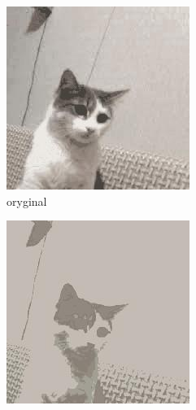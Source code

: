 \documentclass[12pt,a4paper]{article}
\begin{document}
\begin{figure}[htb]
    \centering %
\begin{subfigure}{0.25\textwidth}
  \includegraphics[width=\linewidth]{images/small/original}
  \caption{oryginal}
  \label{fig:1}
\end{subfigure}\hfil %
\begin{subfigure}{0.25\textwidth}
  \includegraphics[width=\linewidth]{images/small/3-3-5-05}

\end{subfigure}
\end{figure}
\end{document}
